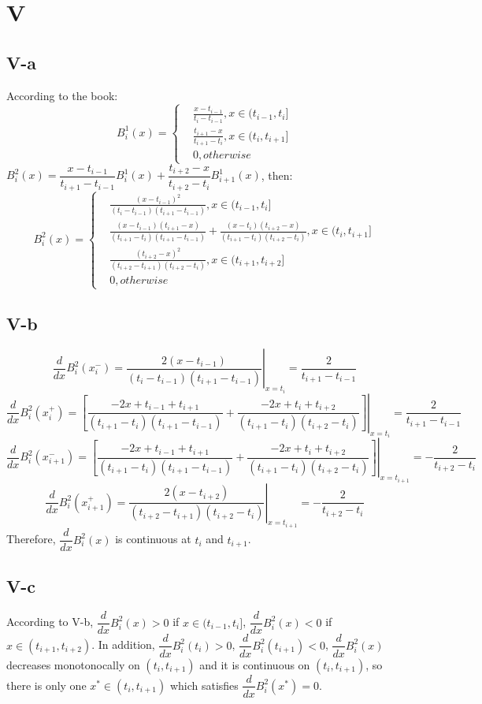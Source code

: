 \documentclass[a4paper]{article}
\begin{document}
\section*{V}
\subsection*{V-a}
According to the book:
$$
B_i^1(x) = \left\{
\begin{aligned}
&\frac{x-t_{i-1}}{t_{i}-t_{i-1}}, x \in (t_{i-1},t_i] \\
&\frac{t_{i+1}-x}{t_{i+1}-t_{i}}, x \in (t_{i},t_{i+1}] \\
&0, otherwise
\end{aligned}
\right.
$$
$B_i^2(x) = \dfrac{x-t_{i-1}}{t_{i+1}-t_{i-1}}B_i^1(x) + \dfrac{t_{i+2}-x}{t_{i+2}-t_{i}}B_{i+1}^1(x)$, then:
$$
B_i^2(x) = \left\{
\begin{aligned}
&\frac{(x-t_{i-1})^2}{(t_{i}-t_{i-1})(t_{i+1}-t_{i-1})}, x \in (t_{i-1},t_i] \\
&\frac{(x-t_{i-1})(t_{i+1}-x)}{(t_{i+1}-t_{i})(t_{i+1}-t_{i-1})} + \frac{(x-t_{i})(t_{i+2}-x)}{(t_{i+1}-t_{i})(t_{i+2}-t_{i})}, x \in (t_i,t_{i+1}] \\
&\frac{(t_{i+2}-x)^2}{(t_{i+2}-t_{i+1})(t_{i+2}-t_{i})}, x \in (t_{i+1},t_{i+2}] \\
&0, otherwise
\end{aligned}
\right.
$$

\subsection*{V-b}
$$
\frac{d}{dx}B_i^2(x_i^{-}) = \left.\frac{2(x-t_{i-1})}{(t_{i}-t_{i-1})(t_{i+1}-t_{i-1})}\right|_{x=t_i} = \frac{2}{t_{i+1}-t_{i-1}}
$$
$$
\frac{d}{dx}B_i^2(x_i^{+}) = \left.[\frac{-2x+t_{i-1}+t_{i+1}}{(t_{i+1}-t_{i})(t_{i+1}-t_{i-1})} + \frac{-2x+t_{i}+t_{i+2}}{(t_{i+1}-t_{i})(t_{i+2}-t_{i})}]\right|_{x=t_i} = \frac{2}{t_{i+1}-t_{i-1}}
$$
$$
\frac{d}{dx}B_i^2(x_{i+1}^{-}) = \left.[\frac{-2x+t_{i-1}+t_{i+1}}{(t_{i+1}-t_{i})(t_{i+1}-t_{i-1})} + \frac{-2x+t_{i}+t_{i+2}}{(t_{i+1}-t_{i})(t_{i+2}-t_{i})}]\right|_{x=t_{i+1}} = -\frac{2}{t_{i+2}-t_i}
$$
$$
\frac{d}{dx}B_i^2(x_{i+1}^{+}) = \left.\frac{2(x-t_{i+2})}{(t_{i+2}-t_{i+1})(t_{i+2}-t_{i})}\right|_{x=t_{i+1}} = -\frac{2}{t_{i+2}-t_i}
$$
Therefore, $\dfrac{d}{dx}B_i^2(x)$ is continuous at $t_i$ and $t_{i+1}$.

\subsection*{V-c}
According to V-b, $\dfrac{d}{dx}B_i^2(x) > 0$ if $x \in (t_{i-1},t_i]$, $\dfrac{d}{dx}B_i^2(x) < 0$ if $x \in (t_{i+1},t_{i+2})$.
In addition, $\dfrac{d}{dx}B_i^2(t_i) > 0$, $\dfrac{d}{dx}B_i^2(t_{i+1}) < 0$, $\dfrac{d}{dx}B_i^2(x)$ decreases monotonocally on $(t_i,t_{i+1})$ and it is continuous on $(t_i,t_{i+1})$, so there is only one 
$x^* \in (t_i,t_{i+1})$ which satisfies $\dfrac{d}{dx}B_i^2(x^*) = 0$.
\end{document}

